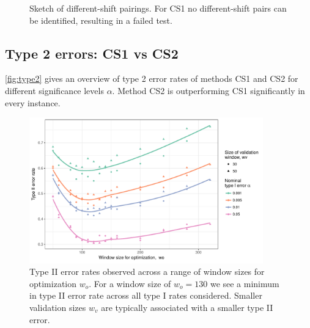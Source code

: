 \documentclass[12pt]{article}
\begin{document}
\begin{appendix}
\begin{figure}[hbtp]
\caption{\label{diff-shift-failure}Sketch of different-shift pairings. For CS1 no different-shift pairs can be identified, resulting in a failed test.}
\end{figure}

\newpage
\subsection{Type 2 errors: CS1 vs CS2}
\label{appendix:appxtype2}
\autoref{fig:type2} gives an overview of type 2 error rates of methods CS1 and CS2 for different significance levels $\alpha$. Method CS2 is outperforming CS1 significantly in every instance.

\begin{figure}[h]

{\centering \includegraphics[width=0.9\textwidth]{figures/type2-1} 

}

\caption{Type II error rates observed across a range of window sizes for optimization $w_o$. For a window size of $w_o = 130$ we see a minimum in type II error rate across all type I rates considered. Smaller validation sizes $w_v$ are typically associated with a smaller type II error.}\label{fig:type2}
\end{figure}

\end{appendix}



\end{document}
